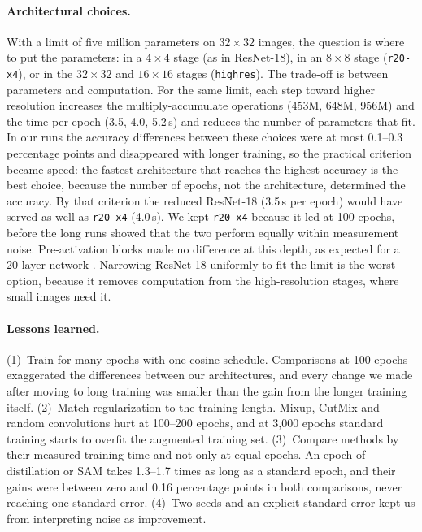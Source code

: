 \documentclass[letterpaper]{article}
\begin{document}
\paragraph{Architectural choices.} With a limit of five million parameters on $32{\times}32$ images, the question is where to put the
parameters: in a $4{\times}4$ stage (as in ResNet-18), in an $8{\times}8$ stage (\texttt{r20-x4}), or in the $32{\times}32$ and
$16{\times}16$ stages (\texttt{highres}). The trade-off is between parameters and computation. For the same limit, each step toward
higher resolution increases the multiply-accumulate operations (453M, 648M, 956M) and the time per epoch (3.5, 4.0, 5.2\,s) and
reduces the number of parameters that fit. In our runs the accuracy differences between these choices were at most 0.1--0.3
percentage points and disappeared with longer training, so the practical criterion became speed: the fastest architecture that
reaches the highest accuracy is the best choice, because the number of epochs, not the architecture, determined the accuracy. By
that criterion the reduced ResNet-18 (3.5\,s per epoch) would have served as well as \texttt{r20-x4} (4.0\,s). We kept
\texttt{r20-x4} because it led at 100 epochs, before the long runs showed that the two perform equally within measurement noise. Pre-activation blocks
made no difference at this depth, as expected for a 20-layer network \cite{he2016identity}. Narrowing ResNet-18 uniformly to fit the
limit is the worst option, because it removes computation from the high-resolution stages, where small images need it.

\paragraph{Lessons learned.}
(1)~Train for many epochs with one cosine schedule. Comparisons at 100 epochs exaggerated the differences between our architectures,
and every change we made after moving to long training was smaller than the gain from the longer training itself. (2)~Match
regularization to the training length. Mixup, CutMix and random convolutions hurt at 100--200 epochs, and at 3,000 epochs standard
training starts to overfit the augmented training set. (3)~Compare methods by their measured training time and not only at equal
epochs. An epoch of distillation or SAM takes 1.3--1.7 times as long as a standard epoch, and their gains were between zero and 0.16
percentage points in both comparisons, never reaching one standard error. (4)~Two seeds and an explicit standard error kept us from
interpreting noise as improvement.
\end{document}
